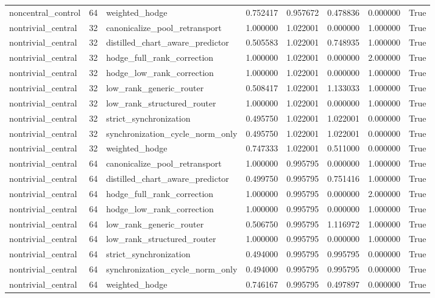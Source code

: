 \begin{tabular}{lrlrrrrr}
noncentral_control & 64 & weighted_hodge & 0.752417 & 0.957672 & 0.478836 & 0.000000 & True \\
nontrivial_central & 32 & canonicalize_pool_retransport & 1.000000 & 1.022001 & 0.000000 & 1.000000 & True \\
nontrivial_central & 32 & distilled_chart_aware_predictor & 0.505583 & 1.022001 & 0.748935 & 1.000000 & True \\
nontrivial_central & 32 & hodge_full_rank_correction & 1.000000 & 1.022001 & 0.000000 & 2.000000 & True \\
nontrivial_central & 32 & hodge_low_rank_correction & 1.000000 & 1.022001 & 0.000000 & 1.000000 & True \\
nontrivial_central & 32 & low_rank_generic_router & 0.508417 & 1.022001 & 1.133033 & 1.000000 & True \\
nontrivial_central & 32 & low_rank_structured_router & 1.000000 & 1.022001 & 0.000000 & 1.000000 & True \\
nontrivial_central & 32 & strict_synchronization & 0.495750 & 1.022001 & 1.022001 & 0.000000 & True \\
nontrivial_central & 32 & synchronization_cycle_norm_only & 0.495750 & 1.022001 & 1.022001 & 0.000000 & True \\
nontrivial_central & 32 & weighted_hodge & 0.747333 & 1.022001 & 0.511000 & 0.000000 & True \\
nontrivial_central & 64 & canonicalize_pool_retransport & 1.000000 & 0.995795 & 0.000000 & 1.000000 & True \\
nontrivial_central & 64 & distilled_chart_aware_predictor & 0.499750 & 0.995795 & 0.751416 & 1.000000 & True \\
nontrivial_central & 64 & hodge_full_rank_correction & 1.000000 & 0.995795 & 0.000000 & 2.000000 & True \\
nontrivial_central & 64 & hodge_low_rank_correction & 1.000000 & 0.995795 & 0.000000 & 1.000000 & True \\
nontrivial_central & 64 & low_rank_generic_router & 0.506750 & 0.995795 & 1.116972 & 1.000000 & True \\
nontrivial_central & 64 & low_rank_structured_router & 1.000000 & 0.995795 & 0.000000 & 1.000000 & True \\
nontrivial_central & 64 & strict_synchronization & 0.494000 & 0.995795 & 0.995795 & 0.000000 & True \\
nontrivial_central & 64 & synchronization_cycle_norm_only & 0.494000 & 0.995795 & 0.995795 & 0.000000 & True \\
nontrivial_central & 64 & weighted_hodge & 0.746167 & 0.995795 & 0.497897 & 0.000000 & True \\
\bottomrule
\end{tabular}
